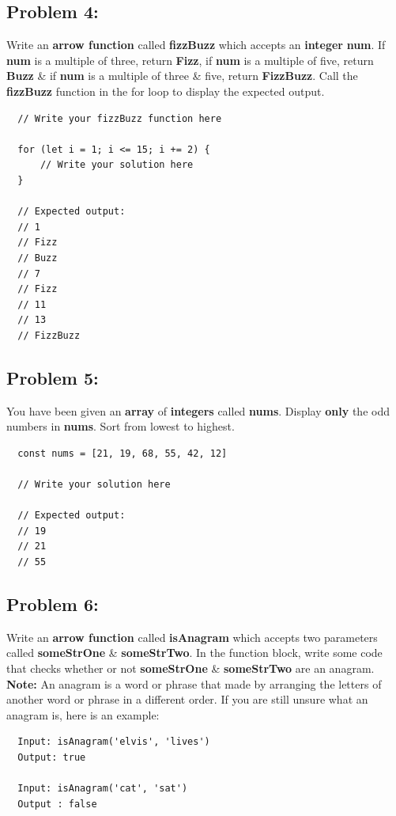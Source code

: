 \documentclass{article}
\begin{document}
\subsection*{Problem 4:}
Write an \textbf{arrow function} called \textbf{fizzBuzz} which accepts an \textbf{integer} \textbf{num}. If \textbf{num} is a multiple of three, return \textbf{Fizz}, if \textbf{num} is a multiple of five, return \textbf{Buzz} \& if \textbf{num} is a multiple of three \& five, return \textbf{FizzBuzz}. Call the \textbf{fizzBuzz} function in the for loop to display the expected output.

\begin{verbatim}
  // Write your fizzBuzz function here

  for (let i = 1; i <= 15; i += 2) {
      // Write your solution here
  }

  // Expected output:
  // 1
  // Fizz 
  // Buzz
  // 7
  // Fizz
  // 11
  // 13
  // FizzBuzz
\end{verbatim}

\subsection*{Problem 5:}
You have been given an \textbf{array} of \textbf{integers} called \textbf{nums}. Display \textbf{only} the odd numbers in \textbf{nums}. Sort from lowest to highest.

\begin{verbatim}
  const nums = [21, 19, 68, 55, 42, 12]
        
  // Write your solution here

  // Expected output:
  // 19
  // 21
  // 55
\end{verbatim}

\subsection*{Problem 6:}
Write an \textbf{arrow function} called \textbf{isAnagram} which accepts two parameters called \textbf{someStrOne} \& \textbf{someStrTwo}. In the function block, write some code that checks whether or not \textbf{someStrOne} \& \textbf{someStrTwo} are an anagram. \textbf{Note:} An anagram is a word or phrase that made by arranging the letters of another word or phrase in a different order. If you are still unsure what an anagram is, here is an example:

\begin{verbatim}
  Input: isAnagram('elvis', 'lives')
  Output: true

  Input: isAnagram('cat', 'sat')
  Output : false
\end{verbatim}
\end{document}
